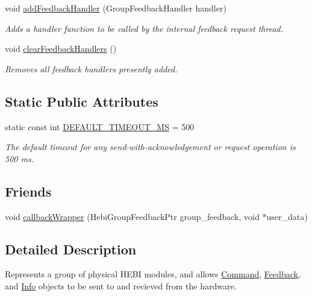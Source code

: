 \begin{DoxyCompactItemize}
void \hyperlink{classhebi_1_1Group_a9b428b5d5cf774f0dddc3b50b5daf90e}{add\+Feedback\+Handler} (Group\+Feedback\+Handler handler)
\begin{DoxyCompactList}\small\item\em Adds a handler function to be called by the internal feedback request thread. \end{DoxyCompactList}\item 
\mbox{\label{classhebi_1_1Group_a54c23fbada200539f7f0d84d97b40f9b}} 
void \hyperlink{classhebi_1_1Group_a54c23fbada200539f7f0d84d97b40f9b}{clear\+Feedback\+Handlers} ()
\begin{DoxyCompactList}\small\item\em Removes all feedback handlers presently added. \end{DoxyCompactList}\end{DoxyCompactItemize}
\subsection*{Static Public Attributes}
\begin{DoxyCompactItemize}
\item 
\mbox{\label{classhebi_1_1Group_a3d01ca6dbd28ec984cda196a77056dd4}} 
static const int \hyperlink{classhebi_1_1Group_a3d01ca6dbd28ec984cda196a77056dd4}{D\+E\+F\+A\+U\+L\+T\+\_\+\+T\+I\+M\+E\+O\+U\+T\+\_\+\+MS} = 500
\begin{DoxyCompactList}\small\item\em The default timeout for any send-\/with-\/acknowledgement or request operation is 500 ms. \end{DoxyCompactList}\end{DoxyCompactItemize}
\subsection*{Friends}
\begin{DoxyCompactItemize}
\item 
void \hyperlink{classhebi_1_1Group_a895e36298e0e77c27c644c4e3edea356}{callback\+Wrapper} (Hebi\+Group\+Feedback\+Ptr group\+\_\+feedback, void $\ast$user\+\_\+data)
\end{DoxyCompactItemize}


\subsection{Detailed Description}
Represents a group of physical H\+E\+BI modules, and allows \hyperlink{classhebi_1_1Command}{Command}, \hyperlink{classhebi_1_1Feedback}{Feedback}, and \hyperlink{classhebi_1_1Info}{Info} objects to be sent to and recieved from the hardware. 

